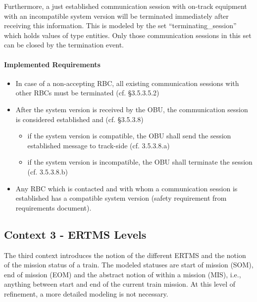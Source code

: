 \documentclass[10pt,a4paper]{article}
\begin{document}
Furthermore, a just established communication session with on-track equipment
with an incompatible system version will be terminated immediately after
receiving this information. This is modeled by the set ``terminating\_session''
which holds values of type entities. Only those communication sessions in this
set can be closed by the termination event.

\paragraph{Implemented Requirements}
\label{sec:impl-requ-2}

\begin{itemize}
\item In case of a non-accepting RBC, all existing communication sessions with
  other RBCs must be terminated (cf. §3.5.3.5.2)
\item After the system version  is received by the OBU, the communication
  session is considered established and (cf. §3.5.3.8)
  \begin{itemize}
  \item if the system version is compatible, the OBU shall send the session
    established message to track-side (cf. 3.5.3.8.a)
  \item if the system version is incompatible, the OBU shall terminate the
    session (cf. 3.5.3.8.b)
  \end{itemize}
\item Any RBC which is contacted and with whom a communication session is
  established has a compatible system version (safety requirement from
  requirements document).
\end{itemize}



\subsection{Context 3 - ERTMS Levels}
\label{sec:context-3-ertms}

The third context introduces the notion of the different ERTMS and the notion of
the mission status of a train. The modeled statuses are start of mission (SOM),
end of mission (EOM) and the abstract notion of within a mission (MIS), i.e.,
anything between start and end of the current train mission. At this level of
refinement, a more detailed modeling is not necessary.


\end{document}
